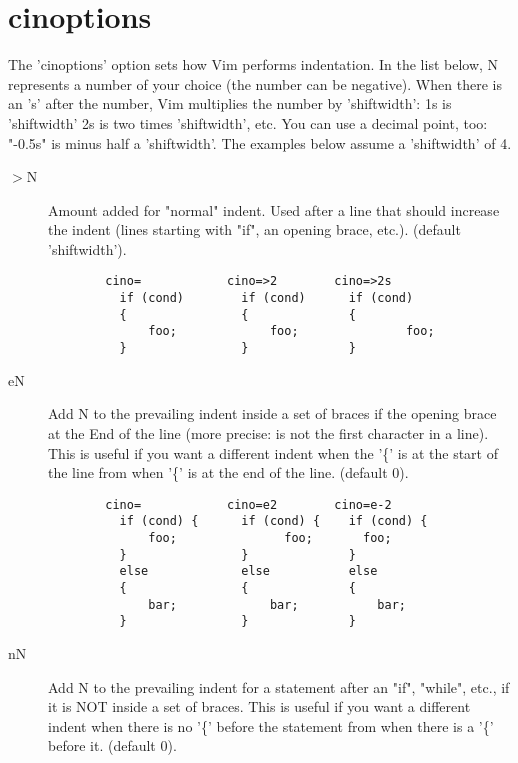 \chapter{cinoptions}
\label{chap:cinoptions}

The 'cinoptions' option sets how Vim performs indentation.  In the list below,
N represents a number of your choice (the number can be negative).  When
there is an 's' after the number, Vim multiplies the number by 'shiftwidth':
1s is 'shiftwidth' 2s is two times 'shiftwidth', etc.  You can use a
decimal point, too: "-0.5s" is minus half a 'shiftwidth'.  The examples below
assume a 'shiftwidth' of 4.

\begin{description}
    \item[$>$N] Amount added for "normal" indent.  Used after a line that should
          increase the indent (lines starting with "if", an opening brace,
          etc.).  (default 'shiftwidth').
\begin{verbatim}
        cino=            cino=>2        cino=>2s
          if (cond)        if (cond)      if (cond)
          {                {              {
              foo;             foo;               foo;
          }                }              }
\end{verbatim}
\clearpage
    \item[eN] Add N to the prevailing indent inside a set of braces if the
          opening brace at the End of the line (more precise: is not the
          first character in a line).  This is useful if you want a
          different indent when the '\{' is at the start of the line from
          when '\{' is at the end of the line.  (default 0).
\begin{verbatim}
        cino=            cino=e2        cino=e-2
          if (cond) {      if (cond) {    if (cond) {
              foo;               foo;       foo;
          }                }              }
          else             else           else
          {                {              {
              bar;             bar;           bar;
          }                }              }
 \end{verbatim} 
    \item[nN] Add N to the prevailing indent for a statement after an "if",
          "while", etc., if it is NOT inside a set of braces.  This is
          useful if you want a different indent when there is no '\{'
          before the statement from when there is a '\{' before it.
          (default 0).
\begin{verbatim}

\end{verbatim}
\end{description}
